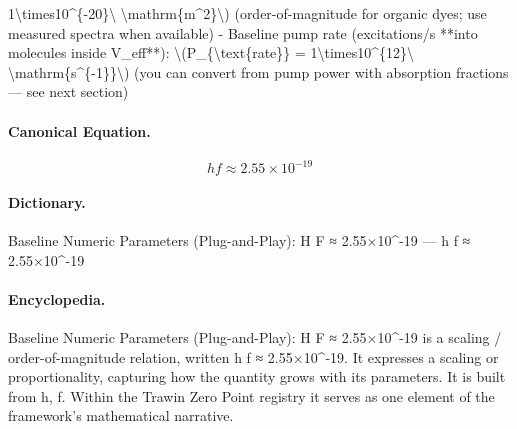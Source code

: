 1\textbackslash{}times10\textasciicircum{}\{-20\}\textbackslash{} \textbackslash{}mathrm\{m\textasciicircum{}2\}\textbackslash{}) (order-of-magnitude for organic dyes; use measured spectra when available) - Baseline pump rate (excitations/s **into molecules inside V\_eff**): \textbackslash{}(P\_\{\textbackslash{}text\{rate\}\} = 1\textbackslash{}times10\textasciicircum{}\{12\}\textbackslash{} \textbackslash{}mathrm\{s\textasciicircum{}\{-1\}\}\textbackslash{}) (you can convert from pump power with absorption fractions — see next section)

\paragraph{Canonical Equation.}
\[
h f \approx 2.55\times10^{-19}
\]

\paragraph{Dictionary.}
Baseline Numeric Parameters (Plug-and-Play): H F ≈ 2.55×10\textasciicircum{}-19 — h f ≈ 2.55×10\textasciicircum{}-19

\paragraph{Encyclopedia.}
Baseline Numeric Parameters (Plug-and-Play): H F ≈ 2.55×10\textasciicircum{}-19 is a scaling / order-of-magnitude relation, written h f ≈ 2.55×10\textasciicircum{}-19. It expresses a scaling or proportionality, capturing how the quantity grows with its parameters. It is built from h, f. Within the Trawin Zero Point registry it serves as one element of the framework's mathematical narrative.
